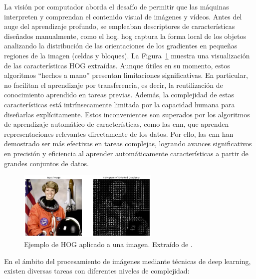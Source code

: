 \documentclass[11pt,spanish,listoffigures,listoftables]{tfgetsinf}
\begin{document}
La visión por computador aborda el desafío de permitir que las máquinas interpreten y comprendan el contenido visual de imágenes y vídeos. Antes del auge del aprendizaje profundo, se empleaban descriptores de características diseñados manualmente, como el \gls{hog}. \gls{hog} captura la forma local de los objetos analizando la distribución de las orientaciones de los gradientes en pequeñas regiones de la imagen (celdas y bloques). La Figura~\ref{fig:hog} muestra una visualización de las características HOG extraídas. Aunque útiles en su momento, estos algoritmos ``hechos a mano'' presentan limitaciones significativas. En particular, no facilitan el aprendizaje por transferencia, es decir, la reutilización de conocimiento aprendido en tareas previas. Además, la complejidad de estas características está intrínsecamente limitada por la capacidad humana para diseñarlas explícitamente. Estos inconvenientes son superados por los algoritmos de aprendizaje automático de características, como las \gls{cnn}, que aprenden representaciones relevantes directamente de los datos. Por ello, las \gls{cnn} han demostrado ser más efectivas en tareas complejas, logrando avances significativos en precisión y eficiencia al aprender automáticamente características a partir de grandes conjuntos de datos.

\begin{figure}[H]
   \centering
   \includegraphics[width=0.6\textwidth]{images/estado_del_arte/HOG_example.png}
   \caption[Ejemplo de HOG aplicado a una imagen]{Ejemplo de HOG aplicado a una imagen. Extraído de \cite{opengenusHOG}.}
   \label{fig:hog}
\end{figure}


En el ámbito del procesamiento de imágenes mediante técnicas de deep learning, existen diversas tareas con diferentes niveles de complejidad:
\end{document}

